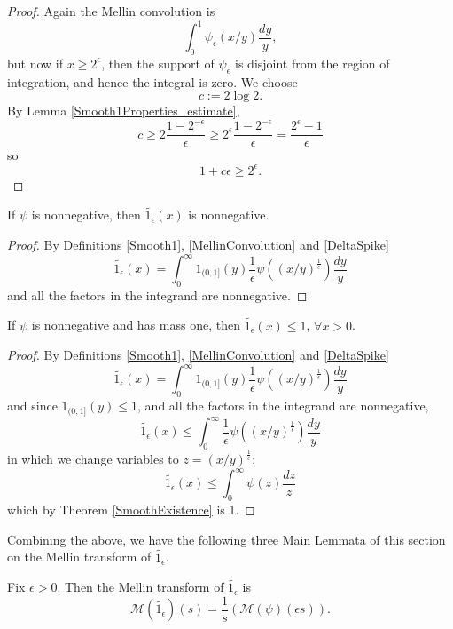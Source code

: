 \begin{proof}
Again the Mellin convolution is
$$\int_0^1 \psi_\epsilon(x/y)\frac{dy}{y},$$
but now if $x \ge 2^\epsilon$, then the support of $\psi_\epsilon$ is disjoint
from the region of integration, and hence the integral is zero.
We choose
$$
  c:=2\log 2
  .
$$
By Lemma \ref{Smooth1Properties_estimate},
$$
  c\geqslant 2\frac{1-2^{-\epsilon}}\epsilon\geqslant 2^\epsilon\frac{1-2^{-\epsilon}}\epsilon
  =
  \frac{2^\epsilon-1}\epsilon
$$
so
$$
  1+c\epsilon\geqslant 2^\epsilon
  .
$$
\end{proof}


\begin{lemma}\label{Smooth1Nonneg}\leanok
If $\psi$ is nonnegative, then $\widetilde{1_{\epsilon}}(x)$ is nonnegative.
\end{lemma}


\begin{proof}
By Definitions \ref{Smooth1}, \ref{MellinConvolution} and \ref{DeltaSpike}
$$
  \widetilde{1_\epsilon}(x)=\int_0^\infty 1_{(0,1]}(y)\frac1\epsilon\psi((x/y)^{\frac1\epsilon}) \frac{dy}y
$$
and all the factors in the integrand are nonnegative.
\end{proof}


\begin{lemma}\label{Smooth1LeOne}\leanok
If $\psi$ is nonnegative and has mass one, then $\widetilde{1_{\epsilon}}(x)\le 1$, $\forall x>0$.
\end{lemma}


\begin{proof}
By Definitions \ref{Smooth1}, \ref{MellinConvolution} and \ref{DeltaSpike}
$$
  \widetilde{1_\epsilon}(x)=\int_0^\infty 1_{(0,1]}(y)\frac1\epsilon\psi((x/y)^{\frac1\epsilon}) \frac{dy}y
$$
and since $1_{(0,1]}(y)\le 1$, and all the factors in the integrand are nonnegative,
$$
  \widetilde{1_\epsilon}(x)\le\int_0^\infty \frac1\epsilon\psi((x/y)^{\frac1\epsilon}) \frac{dy}y
$$
in which we change variables to $z=(x/y)^{\frac1\epsilon}$:
$$
  \widetilde{1_\epsilon}(x)\le\int_0^\infty \psi(z) \frac{dz}z
$$
which by Theorem \ref{SmoothExistence} is 1.
\end{proof}


Combining the above, we have the following three Main Lemmata of this section on the Mellin
transform of $\widetilde{1_{\epsilon}}$.
\begin{lemma}[MellinOfSmooth1a]\label{MellinOfSmooth1a}\leanok
Fix  $\epsilon>0$. Then the Mellin transform of $\widetilde{1_{\epsilon}}$ is
$$\mathcal{M}(\widetilde{1_{\epsilon}})(s) =
\frac{1}{s}\left(\mathcal{M}(\psi)\left(\epsilon s\right)\right).$$
\end{lemma}



